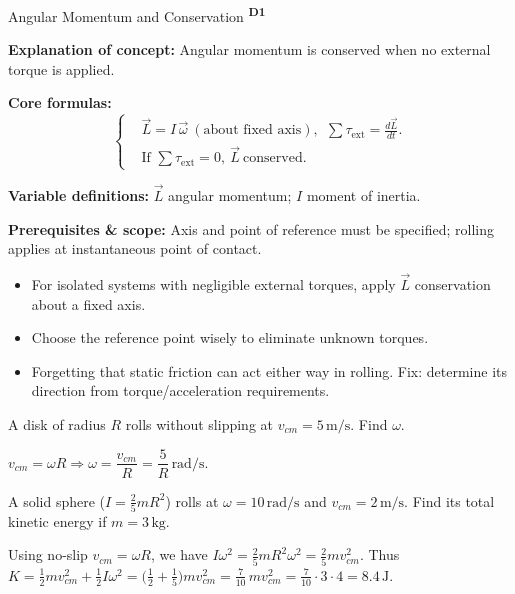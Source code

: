 ﻿\documentclass[12pt,a4paper]{article}
\providecommand{\KPFormulas}{}
\providecommand{\KPHeuristics}{}
\providecommand{\KPProblems}{}
\newcommand{\DOne}{\texorpdfstring{\textsuperscript{\textbf{D1}}}{ D1}}
\begin{document}
\begin{KnowledgePoint}{Angular Momentum and Conservation \DOne}
  \KPFormulas
  \begin{formulabox}
  \textbf{Explanation of concept:} Angular momentum is conserved when no external torque is applied.

  \textbf{Core formulas:}
  \[
  \left\{\begin{aligned}
    &\vec L=I\,\vec\omega\ (\text{about fixed axis}),\ \ \sum \tau_{\text{ext}}=\frac{d\vec L}{dt}.\\
    &\text{If }\sum \tau_{\text{ext}}=0,\ \vec L\ \text{conserved}.
  \end{aligned}\right.
  \]

  \textbf{Variable definitions:} $\vec L$ angular momentum; $I$ moment of inertia.

  \textbf{Prerequisites \& scope:} Axis and point of reference must be specified; rolling applies at instantaneous point of contact.
  \end{formulabox}

  \KPHeuristics
  \begin{heuristicsbox}
  \begin{itemize}[leftmargin=*]
    \item For isolated systems with negligible external torques, apply $\vec L$ conservation about a fixed axis.
    \item Choose the reference point wisely to eliminate unknown torques.
  \end{itemize}
  \vspace{0.4em}
  \begin{itemize}[leftmargin=*]
    \item Forgetting that static friction can act either way in rolling. Fix: determine its direction from torque/acceleration requirements.
  \end{itemize}
  \end{heuristicsbox}

  \KPProblems
\begin{cheatproblem}
  A disk of radius $R$ rolls without slipping at $v_{cm}=5\,\text{m/s}$. Find $\omega$.
\begin{solutionbox}
  $v_{cm}=\omega R\Rightarrow\omega=\dfrac{v_{cm}}{R}=\dfrac{5}{R}\,\text{rad/s}$.
\end{solutionbox}
\end{cheatproblem}
\begin{cheatproblem}
  A solid sphere ($I=\tfrac25 mR^2$) rolls at $\omega=10\,\text{rad/s}$ and $v_{cm}=2\,\text{m/s}$. Find its total kinetic energy if $m=3\,\text{kg}$.
\begin{solutionbox}
  Using no-slip $v_{cm}=\omega R$, we have $I\omega^2=\tfrac25 mR^2\omega^2=\tfrac25 m v_{cm}^2$. Thus
  $K=\tfrac12 m v_{cm}^2+\tfrac12 I\omega^2=\Big(\tfrac12+\tfrac15\Big)m v_{cm}^2=\tfrac{7}{10}\,m v_{cm}^2=\tfrac{7}{10}\cdot3\cdot4=8.4\,\text{J}$.
\end{solutionbox}
\end{cheatproblem}
\end{KnowledgePoint}
\end{document}
